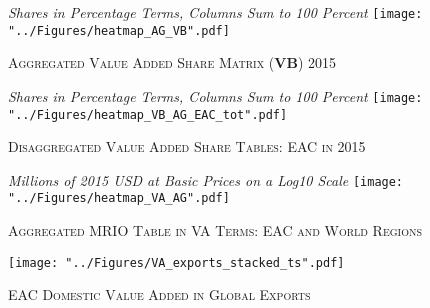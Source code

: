 \documentclass[a4paper]{article}
\begin{document}
\FloatBarrier



























\begin{figure}[h!] \vspace{-7mm}
\centering
\caption{\label{fig:wldVB}\textsc{Aggregated Value Added Share Matrix (\textbf{VB}) 2015}}
\small{\textit{Shares in Percentage Terms, Columns Sum to 100 Percent}}
\texttt{[image: "../Figures/heatmap\_AG\_VB".pdf]} %
\vspace{-30mm}
\end{figure}
\FloatBarrier

\begin{figure}[h!]
\centering
\caption{\label{fig:eacVB}\textsc{Disaggregated Value Added Share Tables: EAC in 2015}}
\small{\textit{Shares in Percentage Terms, Columns Sum to 100 Percent}}
\texttt{[image: "../Figures/heatmap\_VB\_AG\_EAC\_tot".pdf]} %
\end{figure}
\FloatBarrier


\begin{figure}[h!] %
\centering
\caption{\label{fig:VAwld}\textsc{Aggregated MRIO Table in VA Terms: EAC and World Regions}}
\small{\textit{Millions of 2015 USD at Basic Prices on a Log10 Scale}}
\texttt{[image: "../Figures/heatmap\_VA\_AG".pdf]} %
 \vspace{-3mm}
\end{figure}
\FloatBarrier

\begin{figure}[h!] 
\centering
\caption{\label{fig:VAexp}\textsc{EAC Domestic Value Added in Global Exports}}
\texttt{[image: "../Figures/VA\_exports\_stacked\_ts".pdf]} %
\vspace{-20mm}
\end{figure}
\FloatBarrier
\end{document}
